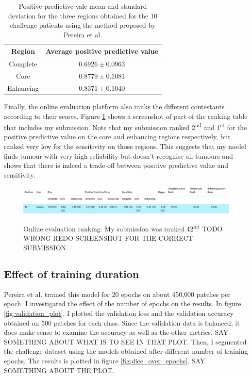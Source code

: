 \documentclass[12pt,a4paper,twoside,openright]{report}
\begin{document}
\begin{table}[h]
\centering	
\label{table:pereira_ppb_average}
\begin{tabular}{ c | c } 
\textbf{Region} & \textbf{Average positive predictive value} \\
\hline
Complete &	$0.6926 \pm 0.0963$ \\
Core & 		$0.8779 \pm 0.1081$ \\
Enhancing & $0.8371  \pm 0.1040$ \\
\end{tabular}
\caption{Positive predictive vale mean and standard deviation for the three regions obtained for the 10 challenge patients using the method proposed by Pereira et al.}
\end{table}

Finally, the online evaluation platform also ranks the different contestants according to their scores. Figure \ref{fig:online_eval_rank} shows a screenshot of part of the ranking table that includes my submission. Note that my submission ranked 2\textsuperscript{nd} and 1\textsuperscript{st} for the positive predictive value on the core and enhancing regions respectively, but ranked very low for the sensitivity on those regions. This suggests that my model finds tumour with very high reliability but doesn't recognise all tumours and shows that there is indeed a trade-off between positive predictive value and sensitivity.

\begin{figure}[h]
	\centering
	\label{fig:online_eval_rank}
	\includegraphics[width=\textwidth]{ranking_table_header}
	\includegraphics[width=\textwidth]{pereira_model_ranked_results}
	\caption{Online evaluation ranking. My submission was ranked 42\textsuperscript{nd} TODO WRONG REDO SCREENSHOT FOR THE CORRECT SUBMISSION}
\end{figure}

\subsection{Effect of training duration}
Pereira et al. trained this model for 20 epochs on about 450,000 patches per epoch. I investigated the effect of the number of epochs on the results. In figure \ref{fig:validation_plot}, I plotted the validation loss and the validation accuracy obtained on 500 patches for each class. Since the validation data is balanced, it does make sense to examine the accuracy as well as the other metrics. SAY SOMETHING ABOUT WHAT IS TO SEE IN THAT PLOT. Then, I segmented the challenge dataset using the models obtained after different number of training epochs. The results is plotted in figure \ref{fig:dice_over_epochs}. SAY SOMETHING ABOUT THE PLOT.
\end{document}
